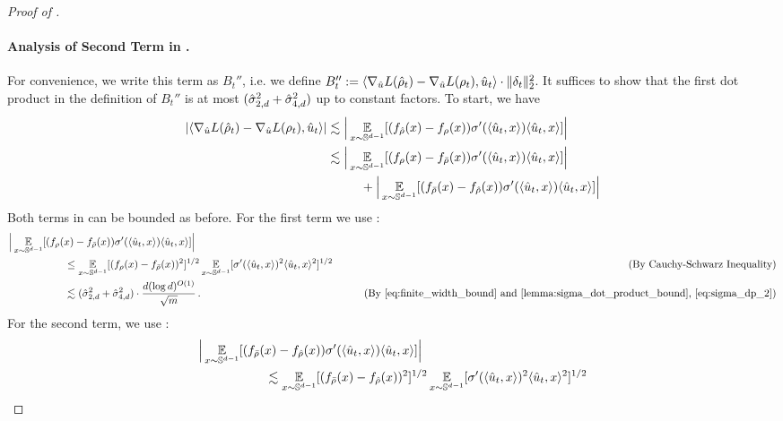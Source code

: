 \begin{proof}[Proof of ]
\paragraph{Analysis of Second Term in .} For convenience, we write this term as $B_t''$, i.e. we define $B_t'' := \langle \nabla_{\hat{u}} L({\hat{\rho}}_t) - \nabla_{\hat{u}} L(\rho_t), \hat{u}_t \rangle \cdot \|\delta_t\|_2^2$. It suffices to show that the first dot product in the definition of $B_t''$ is at most $(\hat{\sigma}_{2, d}^2 + \hat{\sigma}_{4, d}^2)$ up to constant factors. To start, we have
\begin{align}
|\langle \nabla_{\hat{u}} L({\hat{\rho}}_t) - \nabla_{\hat{u}} L(\rho_t), \hat{u}_t \rangle|
& \lesssim \Big| \operatorname*{\mathbb{E}}_{x \sim \mathbb{S}^{d - 1}} [(f_{{\hat{\rho}}}(x) - f_\rho(x)) \sigma'(\langle \hat{u}_t, x \rangle) \langle \hat{u}_t, x \rangle] \Big| \\
& \lesssim \Big| \operatorname*{\mathbb{E}}_{x \sim \mathbb{S}^{d - 1}} [(f_{\rho}(x) - f_{{\bar{\rho}}}(x)) \sigma'(\langle \hat{u}_t, x \rangle) \langle\hat{u}_t, x \rangle] \Big| \\
& \,\,\,\,\,\,\,\,\,\,\,\,\,\,\,\, +  \Big| \operatorname*{\mathbb{E}}_{x \sim \mathbb{S}^{d - 1}} [(f_{{\bar{\rho}}}(x) - f_{{\hat{\rho}}}(x)) \sigma'(\langle \hat{u}_t, x \rangle) \langle\hat{u}_t, x \rangle] \Big| \label{eq:bt_higher_order_pointwise}
\end{align}
Both terms in  can be bounded as before. For the first term we use :
\begin{align}
& \Big| \E_{x \sim \bbS^{d - 1}} [(f_\rho(x) - f_{\rhobar}(x)) \sigma'(\langle \uhat_t, x \rangle) \langle \uhat_t, x \rangle] \Big| \\
& \nextlinespace\nextlinespace \leq \E_{x \sim \bbS^{d - 1}} [(f_\rho(x) - f_{\rhobar}(x))^2]^{1/2} \E_{x \sim \bbS^{d - 1}} [\sigma'(\langle \uhat_t, x \rangle)^2 \langle \uhat_t, x \rangle^2]^{1/2}
& \tag{By Cauchy-Schwarz Inequality} \\
& \nextlinespace\nextlinespace \lesssim (\sigmaCoeffTwo^2 + \sigmaCoeffFour^2) \cdot \frac{d (\log d)^{O(1)}}{\sqrt{m}} \period
& \tag{By \Cref{eq:finite_width_bound} and \Cref{lemma:sigma_dot_product_bound}, \Cref{eq:sigma_dp_2}}
\end{align}
For the second term, we use :
\begin{align}
& \Big| \E_{x \sim \bbS^{d - 1}} [(f_{\rhobar}(x) - f_{\rhohat}(x)) \sigma'(\langle \uhat_t, x \rangle) \langle \uhat_t, x \rangle] \Big| \\
& \nextlinespace\nextlinespace \lesssim \E_{x \sim \bbS^{d - 1}} [(f_{\rhobar}(x) - f_{\rhohat}(x))^2]^{1/2} \E_{x \sim \bbS^{d - 1}} [\sigma'(\langle \uhat_t, x \rangle)^2 \langle \uhat_t, x \rangle^2]^{1/2} 

\end{align}
\end{proof}

